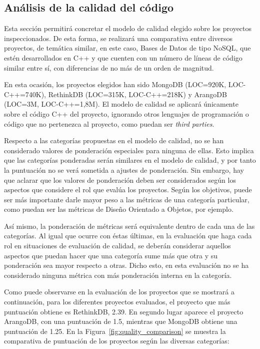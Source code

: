 \documentclass[11pt]{article}
\begin{document}
\subsection{Análisis de la calidad del código}

Esta sección permitirá concretar el modelo de calidad elegido sobre los proyectos inspeccionados. De esta forma, se realizará una comparativa entre diversos proyectos, de temática similar, en este caso, Bases de Datos de tipo NoSQL, que estén desarrollados en C++ y que cuenten con un número de líneas de código similar entre sí, con diferencias de no más de un orden de magnitud.

En esta ocasión, los proyectos elegidos han sido MongoDB (LOC=920K, LOC-C++=740K), RethinkDB (LOC=315K, LOC-C++=218K) y ArangoDB (LOC=3M, LOC-C++=1,8M). El modelo de calidad se aplicará únicamente sobre el código C++ del proyecto, ignorando otros lenguajes de programación o código que no pertenezca al proyecto, como puedan ser \emph{third parties}.

Respecto a las categorías propuestas en el modelo de calidad, no se han considerado valores de ponderación especiales para ninguna de ellas. Esto implica que las categorías ponderadas serán similares en el modelo de calidad, y por tanto la puntuación no se verá sometida a ajustes de ponderación. Sin embargo, hay que aclarar que los valores de ponderación deben ser considerados según los aspectos que considere el rol que evalúa los proyectos. Según los objetivos, puede ser más importante darle mayor peso a las métricas de una categoría particular, como puedan ser las métricas de Diseño Orientado a Objetos, por ejemplo. 

Así mismo, la ponderación de métricas será equivalente dentro de cada una de las categorías. Al igual que ocurre con éstas últimas, en la evaluación que haga cada rol en situaciones de evaluación de calidad, se deberán considerar aquellos aspectos que puedan hacer que una categoría sume más que otra y su ponderación sea mayor respecto a otras. Dicho esto, en esta evaluación no se ha considerado ninguna métrica con más ponderación interna en la categoría.

Como puede observarse en la evaluación de los proyectos que se mostrará a continuación, para los diferentes proyectos evaluados, el proyecto que más puntuación obtiene es RethinkDB, 2.39. En segundo lugar aparece el proyecto ArangoDB, con una puntuación de 1.5, mientras que MongoDB obtiene una puntuación de 1.25. En la Figura~\ref{fig:quality_comparison} se muestra la comparativa de puntuación de los proyectos según las diversas categorías:
\end{document}
